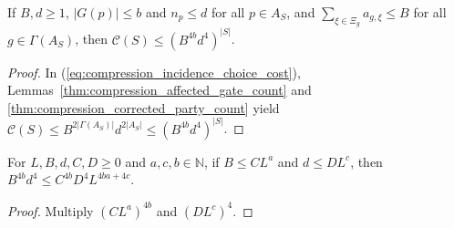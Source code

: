 \begin{lemma}
    \label{thm:compression_position_choice_bound}
    \leanok
    If $B,d\ge1$, $|G(p)|\le b$ and $n_p\le d$ for all $p\in A_S$, and $\sum_{\xi\in\Xi_g}a_{g,\xi}\le B$ for all $g\in\Gamma(A_S)$, then $\mathcal C(S)\le(B^{4b}d^4)^{|S|}$.
\end{lemma}

\begin{proof}\leanok
    In (\ref{eq:compression_incidence_choice_cost}), Lemmas~\ref{thm:compression_affected_gate_count} and \ref{thm:compression_corrected_party_count} yield $\mathcal C(S)\le B^{2|\Gamma(A_S)|}d^{2|A_S|}\le(B^{4b}d^4)^{|S|}$.
\end{proof}

\begin{lemma}
    \label{thm:compression_choice_monomial_bound}
    \leanok
    For $L,B,d,C,D\ge0$ and $a,c,b\in\mathbb N$, if $B\le CL^a$ and $d\le DL^c$, then $B^{4b}d^4\le C^{4b}D^4L^{4ba+4c}$.
\end{lemma}

\begin{proof}\leanok
    Multiply $(CL^a)^{4b}$ and $(DL^c)^4$.
\end{proof}
